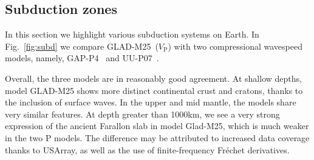 \documentclass[extra,mreferee]{gji}
\begin{document}


\subsection{Subduction zones}
\label{section:slabs}

In this section we highlight various subduction systems on Earth.
In Fig.~\ref{fig:subd} we compare GLAD-M25~($V_\textrm{P}$) with two compressional wavespeed models,
namely, GAP-P4~\citep{fukao2013subducted} and UU-P07~\citep{van2018atlas}.

Overall, the three models are in reasonably good agreement.
At shallow depths, model GLAD-M25 shows more distinct continental crust and cratons, thanks to the inclusion of surface waves.
In the upper and mid mantle,
the models share very similar features.
At depth greater than 1000km, 
we see a very strong expression of the ancient Farallon slab in model Glad-M25, which is much weaker in the two P models.
The difference may be attributed to increased data coverage thanks to USArray, as well as the use of finite-frequency Fr\'echet derivatives.
\end{document}
